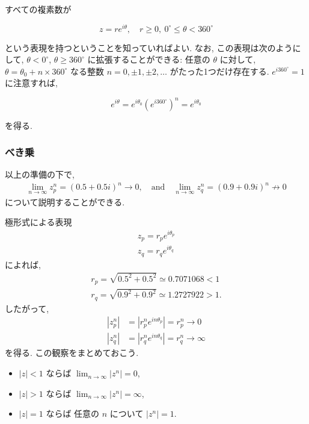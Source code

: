 \documentclass[a4paper]{scrbook}
\providecommand{\tightlist}{%
  \setlength{\itemsep}{0pt}\setlength{\parskip}{0pt}}
\theoremstyle{definition}
\let\BeginKnitrBlock\begin \let\EndKnitrBlock\end
\begin{document}
すべての複素数が

\begin{equation}
  z = re^{i\theta}, \quad r \ge 0,\ 0^\circ \le \theta < 360^\circ
\end{equation}

という表現を持つということを知っていればよい. なお,
この表現は次のようにして, \(\theta < 0^\circ\), \(\theta \ge 360^\circ\)
に拡張することができる: 任意の \(\theta\) に対して,
\(\theta = \theta_0 + n \times 360^\circ\) なる整数
\(n = 0, \pm 1, \pm 2, \dots\) がたった1つだけ存在する.
\(e^{i360^\circ} = 1\) に注意すれば,

\begin{equation}
  e^{i\theta} = e^{i\theta_0}\left(e^{i360^\circ}\right)^n = e^{i\theta_0}
\end{equation}

を得る.

\subsubsection*{べき乗}\label{-1}

以上の準備の下で, \[
\begin{aligned}
  \lim_{n\to\infty} z_p^n  = (0.5 + 0.5i)^n \to 0,
  \quad \text{and}\quad
  \lim_{n\to\infty} z_q^n = (0.9 + 0.9i)^n \not\to 0
\end{aligned}
\] について説明することができる.

極形式による表現 \[
\begin{aligned}
  z_p = r_p e^{i\theta_p}\\
  z_q = r_q e^{i\theta_q}
\end{aligned}
\] によれば, \[
\begin{aligned}
  r_p = \sqrt{0.5^2 + 0.5^2} \simeq 0.7071068 < 1\\ 
  r_q = \sqrt{0.9^2 + 0.9^2} \simeq 1.2727922 > 1.
\end{aligned}
\] したがって, \[
\begin{aligned}
  |z_p^n| &= |r_p^n e^{i n\theta_p}| = r_p^n \to 0\\
  |z_q^n| &= |r_q^n e^{i n\theta_q}| = r_q^n \to \infty
\end{aligned}
\] を得る. この観察をまとめておこう.

\BeginKnitrBlock{fact}
\begin{itemize}
\tightlist
\item
  \(|z| < 1\) ならば \(\lim_{n\to\infty} |z^n| = 0\),
\item
  \(|z| > 1\) ならば \(\lim_{n\to\infty} |z^n| = \infty\),
\item
  \(|z| = 1\) ならば 任意の \(n\) について \(|z^n| = 1\).
\end{itemize}
\EndKnitrBlock{fact}
\end{document}
